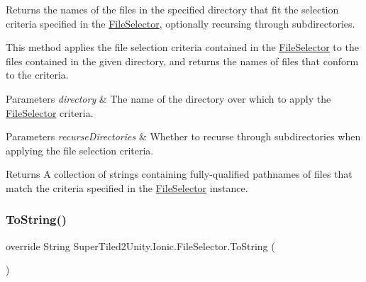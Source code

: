 Returns the names of the files in the specified directory that fit the selection criteria specified in the \mbox{\hyperlink{class_super_tiled2_unity_1_1_ionic_1_1_file_selector}{File\+Selector}}, optionally recursing through subdirectories. 

This method applies the file selection criteria contained in the \mbox{\hyperlink{class_super_tiled2_unity_1_1_ionic_1_1_file_selector}{File\+Selector}} to the files contained in the given directory, and returns the names of files that conform to the criteria. 


\begin{DoxyParams}{Parameters}
{\em directory} & The name of the directory over which to apply the \mbox{\hyperlink{class_super_tiled2_unity_1_1_ionic_1_1_file_selector}{File\+Selector}} criteria. \\
\hline
\end{DoxyParams}



\begin{DoxyParams}{Parameters}
{\em recurse\+Directories} & Whether to recurse through subdirectories when applying the file selection criteria. \\
\hline
\end{DoxyParams}


\begin{DoxyReturn}{Returns}
A collection of strings containing fully-\/qualified pathnames of files that match the criteria specified in the \mbox{\hyperlink{class_super_tiled2_unity_1_1_ionic_1_1_file_selector}{File\+Selector}} instance. 
\end{DoxyReturn}
\mbox{\label{class_super_tiled2_unity_1_1_ionic_1_1_file_selector_a8fa535a32889af944e74d9621c93edf1}} 
\subsubsection{\texorpdfstring{To\+String()}{ToString()}}
{\footnotesize\ttfamily override String Super\+Tiled2\+Unity.\+Ionic.\+File\+Selector.\+To\+String (\begin{DoxyParamCaption}{ }\end{DoxyParamCaption})}



